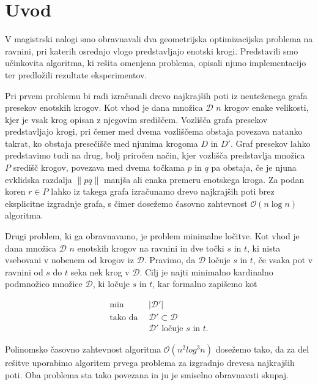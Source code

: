\documentclass[a4paper, 12pt]{book}
\newcommand{\D}{\ensuremath{\mathcal{D}}}
\newcommand{\OO}{\ensuremath{\mathcal{O}}} %
\begin{document}
\mainmatter
\setcounter{page}{1}
\pagestyle{fancy}

\chapter{Uvod}
V magistrski nalogi smo obravnavali dva geometrijska optimizacijska problema na ravnini, pri katerih osrednjo vlogo predstavljajo enotski krogi. Predstavili smo učinkovita algoritma, ki rešita omenjena problema, opisali njuno implementacijo ter predložili rezultate eksperimentov.

Pri prvem problemu bi radi izračunali drevo najkrajših poti iz neuteženega grafa presekov enotskih krogov. Kot vhod je dana množica $\D$ $n$ krogov enake velikosti, kjer je vsak krog opisan z njegovim središčem. Vozlišča grafa presekov predstavljajo krogi, pri čemer med dvema vozliščema obstaja povezava natanko takrat, ko obstaja presečišče med njunima krogoma $D$ in $D'$. Graf presekov lahko predstavimo tudi na drug, bolj priročen način, kjer vozlišča predstavlja množica $P$ središč krogov, povezava med dvema točkama $p$ in $q$ pa obstaja, če je njuna evklidska razdalja $\|pq\|$ manjša ali enaka premeru enotskega kroga. Za podan koren $r \in P$ lahko iz takega grafa izračunamo drevo najkrajših poti brez eksplicitne izgradnje grafa, s čimer dosežemo časovno zahtevnost $\OO(n\log n)$ algoritma.

Drugi problem, ki ga obravnavamo, je problem minimalne ločitve. Kot vhod je dana množica $\D$ $n$ enotskih krogov na ravnini in dve točki $s$ in $t$, ki nista vsebovani v nobenem od krogov iz $\D$. Pravimo, da $\D$ ločuje $s$ in $t$, če vsaka pot v ravnini od $s$ do $t$ seka nek krog v $\D$. Cilj je najti minimalno kardinalno podmnožico množice $\D$, ki ločuje $s$ in $t$, kar formalno zapišemo kot 

\begin{align*}
	\min ~~		& |\D'|\\
	 \mbox{tako da}~~ & \D'\subset \D\\
				&	\D'\text{ ločuje $s$ in $t$}. 
\end{align*}

Polinomsko časovno zahtevnost algoritma $\OO(n^2log^3n)$ dosežemo tako, da za del rešitve uporabimo algoritem prvega problema za izgradnjo drevesa najkrajših poti. Oba problema sta tako povezana in ju je smiselno obravnavati skupaj.
\end{document}

